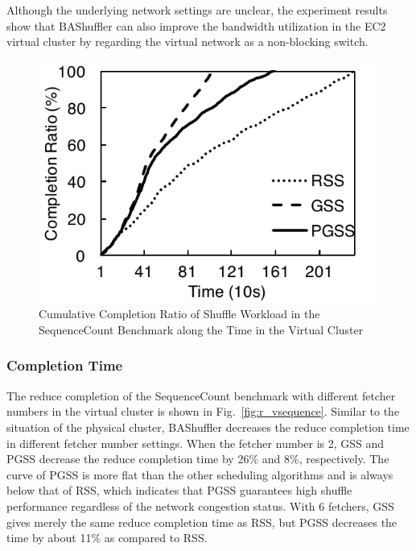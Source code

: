 \documentclass[10pt,journal,compsoc]{IEEEtran}
\begin{document}
Although the underlying network settings are unclear, the experiment
results show that BAShuffler can also improve the bandwidth
utilization in the EC2 virtual cluster by regarding the virtual
network as a non-blocking switch.

\begin{figure}[!t]
\centering
\includegraphics[width=0.7\columnwidth,height=0.4\columnwidth]{figure9}
\caption{Cumulative Completion Ratio of Shuffle Workload in the SequenceCount Benchmark along the Time in the Virtual Cluster}
\label{fig:r_vshuffle_timeline}
\end{figure}

\subsubsection{Completion Time}
The reduce completion of the SequenceCount benchmark with different fetcher numbers in the virtual cluster is shown in Fig.~\ref{fig:r_vsequence}. 
Similar to the situation of the physical cluster,
BAShuffler decreases the reduce
completion time in different fetcher number settings.
When the fetcher number is 2, GSS and PGSS decrease the reduce
completion time by 26\% and 8\%, respectively.
The curve of PGSS is more flat than the other scheduling algorithms and is always below that of RSS, 
which indicates that PGSS guarantees high shuffle performance regardless of the network congestion status.
With 6 fetchers, GSS gives merely the same reduce completion time as RSS, but PGSS
decreases the time by about 11\% as compared to RSS. 
\end{document}
